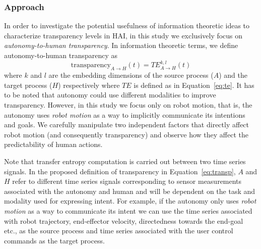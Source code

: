 \documentclass[12pt]{article}
\begin{document}
\subsubsection{Approach}
In order to investigate the potential usefulness of information theoretic ideas to characterize transparency levels in HAI, in this study we exclusively focus on \textit{autonomy-to-human transparency}. In information theoretic terms, we define autonomy-to-human transparency as
\begin{equation}\label{eq:transp}
\text{transparency}_{A \rightarrow H}(t) = TE_{A \rightarrow H}^{k,l}(t)
\end{equation}
where $k$ and $l$ are the embedding dimensions of the source process ($A$) and the target process ($H$) respectively where $TE$ is defined as in Equation~\ref{eq:te}. 
It has to be noted that autonomy could use different modalities to improve transparency. However, in this study we focus only on robot motion, that is, the autonomy uses \textit{robot motion} as a way to implicitly communicate its intentions and goals. We carefully manipulate two independent factors that directly affect robot motion (and consequently transparency) and observe how they affect the predictability of human actions. 

Note that transfer entropy computation is carried out between two time series signals. In the proposed definition of transparency in Equation~\ref{eq:transp}, $A$ and $H$ refer to different time series signals corresponding to sensor measurements associated with the autonomy and human and will be dependent on the task and modality used for expressing intent. For example, if the autonomy only uses \textit{robot motion} as a way to communicate its intent we can use the time series associated with robot trajectory, end-effector velocity, directedness towards the end-goal etc., as the source process and time series associated with the user control commands as the target process.
%
%
%
%
\end{document}
